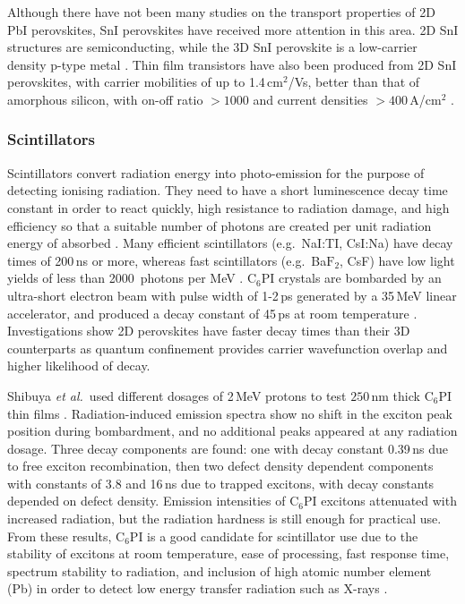 Although there have not been many studies on the transport properties of 2D PbI perovskites, SnI perovskites have received more attention in this area. 2D SnI structures are semiconducting, while the 3D SnI perovskite is a low-carrier density p-type metal \cite{Mitzi1994}. Thin film transistors have also been produced from 2D SnI perovskites, with carrier mobilities of up to 1.4\,cm$^2$/Vs, better than that of amorphous silicon, with on-off ratio $>1000$ and current densities $>400$\,A/cm$^2$ \cite{Mitzi2002b, Mitzi2001d, Kagan1999a}.

\subsubsection{Scintillators}
Scintillators convert radiation energy into photo-emission for the purpose of detecting ionising radiation. They need to have a short luminescence decay time constant in order to react quickly, high resistance to radiation damage, and high efficiency so that a suitable number of photons are created per unit radiation energy of absorbed \cite{Shibuya2002}. Many efficient scintillators (e.g.\ NaI:TI, CsI:Na) have decay times of 200\,ns or more, whereas fast scintillators (e.g.\ Ba$\textrm{F}_2$, CsF) have low light yields of less than 2000~photons per MeV \cite{Kengo2002}. $\textrm{C}_6$PI crystals are bombarded by an ultra-short electron beam with pulse width of 1-2\,ps generated by a 35\,MeV linear accelerator, and produced a decay constant of 45\,ps at room temperature \cite{Kengo2002}. Investigations show 2D perovskites have faster decay times than their 3D counterparts as quantum confinement provides carrier wavefunction overlap and higher likelihood of decay.

Shibuya \textit{et al.}\ used different dosages of 2\,MeV protons to test $250$\,nm thick $\textrm{C}_6$PI thin films \cite{Shibuya2002}. Radiation-induced emission spectra show no shift in the exciton peak position during bombardment, and no additional peaks appeared at any radiation dosage. Three decay components are found: one with decay constant 0.39\,ns due to free exciton recombination, then two defect density dependent components with constants of 3.8 and 16\,ns due to trapped excitons, with decay constants depended on defect density. Emission intensities of $\textrm{C}_6$PI excitons attenuated with increased radiation, but the radiation hardness is still enough for practical use. From these results, $\textrm{C}_6$PI is a good candidate for scintillator use due to the stability of excitons at room temperature, ease of processing, fast response time, spectrum stability to radiation, and inclusion of high atomic number element (Pb) in order to detect low energy transfer radiation such as X-rays \cite{Shibuya2004}. 

